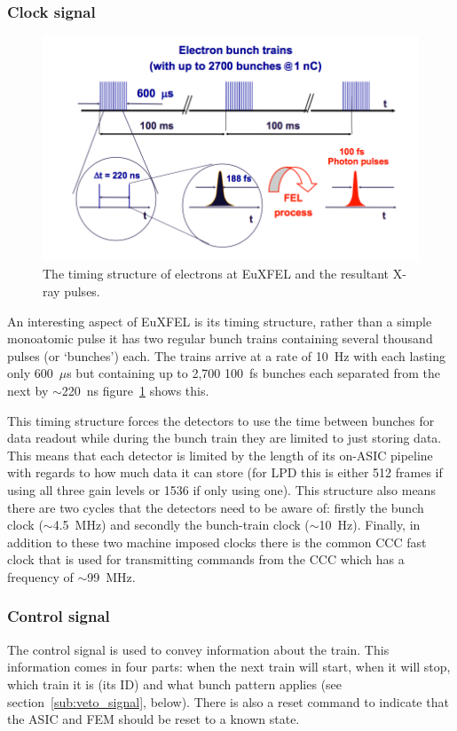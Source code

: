 \subsubsection{Clock signal} %
\label{sub:clock_signal}
\begin{figure}[h]
  \centering
    \includegraphics[width=.9\textwidth]{appendix_XFEL/images/Other/XFEL-time_structure.png}
  \caption{The timing structure of electrons at EuXFEL and the resultant X-ray pulses. }
  \label{fig:XFEL-time_structure}
\end{figure}

An interesting aspect of EuXFEL is its timing structure, rather than a simple monoatomic pulse it has two regular bunch trains containing several thousand pulses (or `bunches') each. The trains arrive at a rate of 10~Hz with each lasting only 600~\(\mu\)s but containing up to 2,700 100~fs bunches each separated from the next by \( \sim \)220~ns figure~\ref{fig:XFEL-time_structure} shows this.

This timing structure forces the detectors to use the time between bunches for data readout while during the bunch train they are limited to just storing data. This means that each detector is limited by the length of its on-ASIC pipeline with regards to how much data it can store (for LPD this is either 512 frames if using all three gain levels or 1536 if only using one). This structure also means there are two cycles that the detectors need to be aware of: firstly the bunch clock (\(\sim\)4.5~MHz) and secondly the bunch-train clock (\(\sim\)10~Hz). Finally, in addition to these two machine imposed clocks there is the common CCC fast clock that is used for transmitting commands from the CCC which has a frequency of \(\sim\)99~MHz.
\subsubsection{Control signal} %
\label{sub:control_signal}
The control signal is used to convey information about the train. This information comes in four parts: when the next train will start, when it will stop, which train it is (its ID) and what bunch pattern applies (see section~\ref{sub:veto_signal}, below). There is also a reset command to indicate that the ASIC and FEM should be reset to a known state. 

